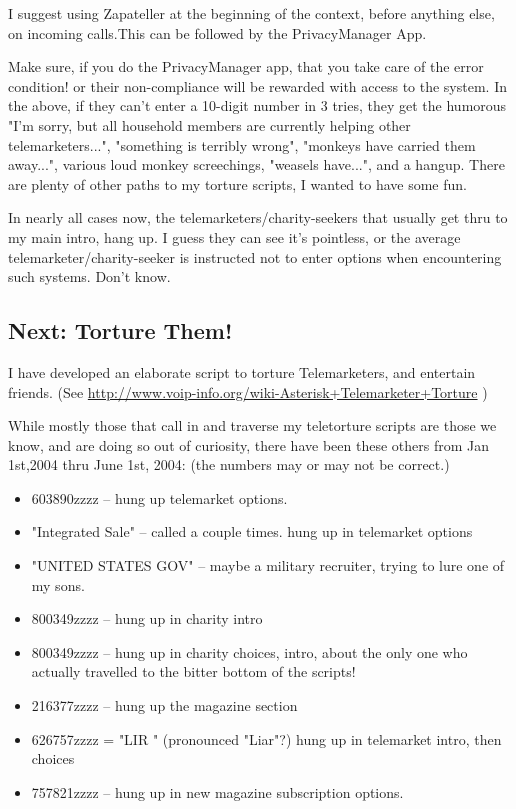 I suggest using Zapateller at the beginning of the context, before
anything else, on incoming calls.This can be followed by the
PrivacyManager App.

Make sure, if you do the PrivacyManager app, that you take care of the
error condition! or their non-compliance will be rewarded with access
to the system. In the above, if they can't enter a 10-digit number in
3 tries, they get the humorous "I'm sorry, but all household members
are currently helping other telemarketers...", "something is terribly
wrong", "monkeys have carried them away...", various loud monkey
screechings, "weasels have...", and a hangup. There are plenty of
other paths to my torture scripts, I wanted to have some fun.

In nearly all cases now, the telemarketers/charity-seekers that
usually get thru to my main intro, hang up. I guess they can see it's
pointless, or the average telemarketer/charity-seeker is instructed
not to enter options when encountering such systems. Don't know.


\subsection{Next: Torture Them!}

I have developed an elaborate script to torture Telemarketers, and
entertain friends. (See
\url{http://www.voip-info.org/wiki-Asterisk+Telemarketer+Torture} )

While mostly those that call in and traverse my teletorture scripts
are those we know, and are doing so out of curiosity, there have been
these others from Jan 1st,2004 thru June 1st, 2004:
(the numbers may or may not be correct.)

\begin{itemize}
    \item 603890zzzz -- hung up telemarket options.
    \item "Integrated Sale" -- called a couple times. hung up in telemarket options
    \item "UNITED STATES GOV" -- maybe a military recruiter, trying to lure one of my sons.
    \item 800349zzzz -- hung up in charity intro
    \item 800349zzzz -- hung up in charity choices, intro, about the only one who actually travelled to the bitter bottom of the scripts!
    \item 216377zzzz -- hung up the magazine section
    \item 626757zzzz = "LIR    " (pronounced "Liar"?) hung up in telemarket intro, then choices
    \item 757821zzzz -- hung up in new magazine subscription options.
\end{itemize}

